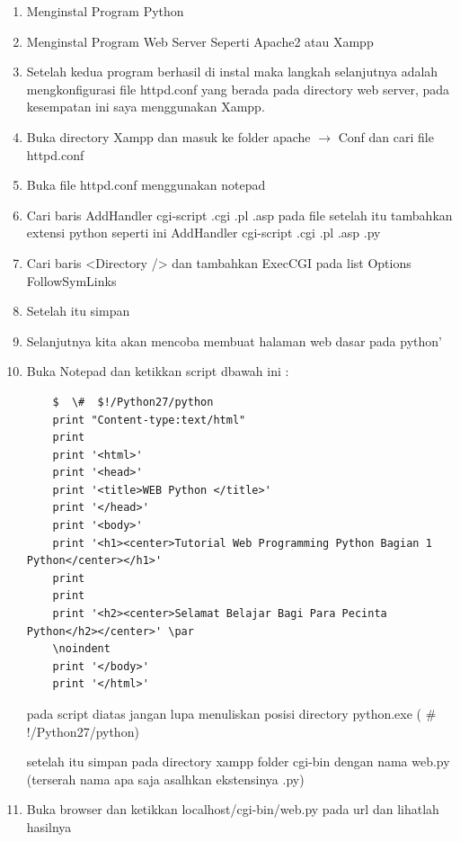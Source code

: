 \begin{enumerate}
	\item Menginstal Program Python \par
	\noindent 
	\item Menginstal Program Web Server Seperti Apache2 atau Xampp \par
	\noindent 
	\item Setelah kedua program berhasil di instal maka langkah selanjutnya adalah mengkonfigurasi file httpd.conf yang berada pada directory web server, pada kesempatan ini saya menggunakan Xampp. \par
	\noindent 
	\item Buka directory Xampp dan masuk ke folder apache  $  \rightarrow  $ Conf dan cari file httpd.conf \par
	\noindent 
	\item Buka file httpd.conf menggunakan notepad \par
	\noindent 
	\item Cari baris AddHandler cgi-script .cgi .pl .asp pada file setelah itu tambahkan extensi python seperti ini AddHandler cgi-script .cgi .pl .asp .py \par
	\noindent 
	\item Cari baris <Directory /> dan tambahkan ExecCGI pada list Options FollowSymLinks \par
	\noindent 
	\item Setelah itu simpan \par
	\noindent 
	\item Selanjutnya kita akan mencoba membuat halaman web dasar pada python’ \par
	\noindent 
	\item Buka Notepad dan ketikkan script dbawah ini : \par
	\vspace{12pt}
	\noindent 
	\begin{verbatim}
	$  \#  $!/Python27/python
	print "Content-type:text/html" 
	print 
	print '<html>' 
	print '<head>' 
	print '<title>WEB Python </title>' 
	print '</head>' 
	print '<body>'
	print '<h1><center>Tutorial Web Programming Python Bagian 1 Python</center></h1>' 
	print 
	print
	print '<h2><center>Selamat Belajar Bagi Para Pecinta Python</h2></center>' \par
	\noindent 
	print '</body>' 
	print '</html>'
	\end{verbatim}
	pada script diatas jangan lupa menuliskan posisi directory python.exe ( $  \#  $!/Python27/python) \par
	\noindent 
	setelah itu simpan pada directory xampp folder cgi-bin dengan nama web.py (terserah nama apa saja asalhkan ekstensinya .py) \par
	\noindent 
	\item Buka browser dan ketikkan localhost/cgi-bin/web.py pada url dan lihatlah hasilnya\end{enumerate}
